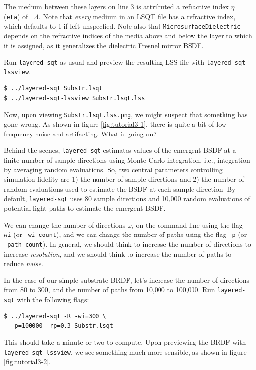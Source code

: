 \documentclass[
    twoside,
    twocolumn,
    letterpaper,
    10pt]{article}
\newcommand\namett[2]{{\color{code#1}\texttt{#2}}}
\begin{document}
The medium between these layers on line 3 is attributed a
refractive index $\eta$ (\texttt{eta}) of $1.4$. Note that 
\emph{every} medium in an LSQT
file has a refractive index, which defaults to 1 if left unspecfied. 
Note also that \namett{purple}{MicrosurfaceDielectric} depends on the
refractive indices of the media above and below the layer to which it is
assigned, as it generalizes the dielectric Fresnel mirror BSDF.

Run \texttt{layered-sqt} as usual and preview the resulting LSS 
file with \texttt{layered-sqt-lssview}.
\begin{verbatim}
$ ../layered-sqt Substr.lsqt
$ ../layered-sqt-lssview Substr.lsqt.lss
\end{verbatim}
Now, upon viewing \texttt{Substr.lsqt.lss.png}, we might suspect that 
something has gone wrong. As shown in figure \ref{fig:tutorial3-1},
there is quite a bit of low frequency noise and artifacting. What is
going on?

Behind the scenes, \texttt{layered-sqt} estimates values of the emergent 
BSDF at a finite number of sample directions using Monte Carlo integration, 
i.e., integration by averaging random evaluations. So, two central parameters 
controlling simulation fidelity are 1) the number of sample directions and 2) 
the number of random evaluations used to estimate the BSDF at each sample 
direction. By default, \texttt{layered-sqt} uses 80 sample directions and
10,000 random evaluations of potential light paths to estimate the 
emergent BSDF. 

We can change the number of directions $\omega_i$ on the command line 
using the flag \texttt{-wi} (or \texttt{--wi-count}), and we can change the
number of paths using the flag \texttt{-p} (or \texttt{--path-count}).
In general, we should think to increase the number of directions
to increase \emph{resolution}, and we should think to increase the number 
of paths to reduce \emph{noise}.

In the case of our simple substrate BRDF, let's increase the number 
of directions from 80 to 300, and the number of paths from 10,000 to 
100,000. Run \texttt{layered-sqt} with the following flags:
\begin{verbatim}
$ ../layered-sqt -R -wi=300 \
  -p=100000 -rp=0.3 Substr.lsqt
\end{verbatim}
This should take a minute or two to compute. Upon previewing the BRDF with
\texttt{layered-sqt-lssview}, we see something much more sensible, as shown
in figure \ref{fig:tutorial3-2}.
\end{document}
